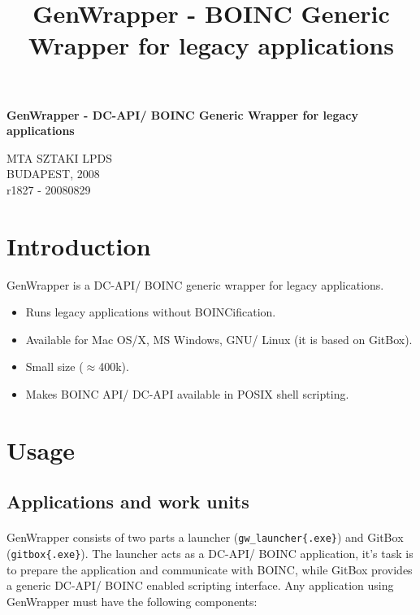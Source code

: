 \documentclass[a4paper,12pt,titlepage,dvipdfm]{article}
\title{GenWrapper - BOINC Generic Wrapper for legacy applications}
\begin{document}
\begin{center}
    \vspace*{20mm}
	\LARGE{\textbf{GenWrapper - DC-API/ BOINC Generic Wrapper for legacy applications}}
	\vfill
\end{center}
\begin{center}
    \vspace{30mm}
    \Large{MTA SZTAKI LPDS}\\
    \vspace{10mm}
    \large{BUDAPEST, 2008}\\
    \vspace{100mm}
    \small{r1827 - 20080829}
\end{center}
\thispagestyle{empty}

\pagebreak
\tableofcontents

\pagebreak
          

\section{Introduction}

GenWrapper is a DC-API/ BOINC generic wrapper for legacy applications.

\begin{itemize}
    \item Runs legacy applications without BOINCification.
    \item Available for Mac OS/X, MS Windows, GNU/ Linux (it is based on GitBox).
    \item Small size (\(\approx\)400k).
    \item Makes BOINC API/ DC-API available in POSIX shell scripting.
\end{itemize}

\section{Usage}

\subsection{Applications and work units}

\paragraph*{} GenWrapper consists of two parts a launcher (\texttt{gw\_launcher\{.exe\}}) and GitBox (\texttt{gitbox\{.exe\}}). The launcher acts as a DC-API/ BOINC application, it's task is to prepare the application and communicate with BOINC, while GitBox provides a generic DC-API/ BOINC enabled scripting interface. Any application using GenWrapper must have the following components:
\end{document}

